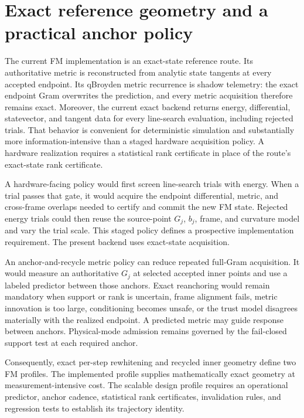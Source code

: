 \documentclass[10pt,twocolumn]{article}
\begin{document}
\section*{Exact reference geometry and a practical anchor policy}

The current FM implementation is an exact-state reference route. Its
authoritative metric is reconstructed from analytic state tangents at every
accepted endpoint. Its qBroyden metric recurrence is shadow telemetry: the
exact endpoint Gram overwrites the prediction, and every metric acquisition
therefore remains exact. Moreover, the current exact backend returns energy,
differential, statevector, and tangent data for every line-search evaluation,
including rejected trials. That behavior is convenient for deterministic
simulation and substantially more information-intensive than a staged hardware
acquisition policy. A hardware realization requires a statistical rank
certificate in place of the route's exact-state rank certificate.

A hardware-facing policy would first screen line-search trials with energy.
When a trial passes that gate, it would acquire the endpoint differential,
metric, and cross-frame overlaps needed to certify and commit the new FM state.
Rejected energy trials could then reuse the source-point \(G_j\), \(b_j\),
frame, and curvature model and vary the trial scale. This staged
policy defines a prospective implementation requirement. The present backend
uses exact-state acquisition.

An anchor-and-recycle metric policy can reduce repeated full-Gram acquisition.
It would measure an authoritative \(G_j\)
at selected accepted inner points and use a labeled predictor between those
anchors. Exact reanchoring would remain mandatory when support or rank is
uncertain, frame alignment fails, metric innovation is too large, conditioning
becomes unsafe, or the trust model disagrees materially with the realized
endpoint. A predicted metric may guide response between anchors. Physical-mode
admission remains governed by the fail-closed support test at each required
anchor.

Consequently, exact per-step rewhitening and recycled inner geometry define two
FM profiles. The implemented profile supplies mathematically exact geometry at
measurement-intensive cost. The scalable design profile requires an
operational predictor, anchor cadence, statistical rank certificates,
invalidation rules, and regression tests to establish its trajectory identity.
\end{document}
